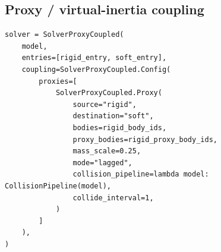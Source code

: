 \documentclass[11pt]{article}
\begin{document}
\subsection{Proxy / virtual-inertia coupling}

\begin{verbatim}
solver = SolverProxyCoupled(
    model,
    entries=[rigid_entry, soft_entry],
    coupling=SolverProxyCoupled.Config(
        proxies=[
            SolverProxyCoupled.Proxy(
                source="rigid",
                destination="soft",
                bodies=rigid_body_ids,
                proxy_bodies=rigid_proxy_body_ids,
                mass_scale=0.25,
                mode="lagged",
                collision_pipeline=lambda model: CollisionPipeline(model),
                collide_interval=1,
            )
        ]
    ),
)
\end{verbatim}
\end{document}
